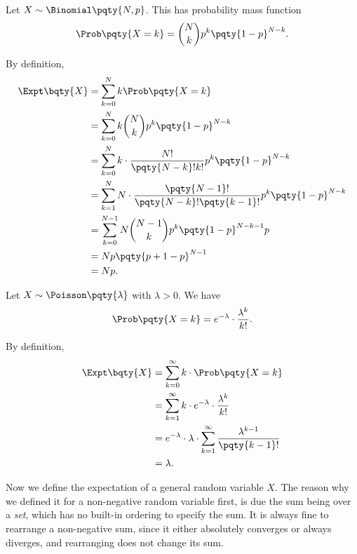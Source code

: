 \begin{example}
    \label{ex:expectation-binomial}%
    Let \(X \sim \Binomial\pqty{N, p}\). This has probability mass function
    \[
        \Prob\pqty{X = k} = \binom{N}{k} p^k \pqty{1 - p}^{N - k}.
    \]

    By definition,
    \begin{align*}
        \Expt\bqty{X} &= \sum_{k = 0}^{N} k \Prob\pqty{X = k} \\
        &= \sum_{k = 0}^{N} k \binom{N}{k} p^k \pqty{1 - p}^{N - k} \\
        &= \sum_{k = 0}^{N} k \cdot \frac{N!}{\pqty{N - k}! k!} p^k \pqty{1 - p}^{N - k} \\
        &= \sum_{k = 1}^{N} N \cdot \frac{\pqty{N - 1}!}{\pqty{N - k}! \pqty{k - 1}!} p^k \pqty{1 - p}^{N - k} \\
        &= \sum_{k = 0}^{N - 1} N \binom{N - 1}{k} p^{k} \pqty{1 - p}^{N - k - 1} p \\
        &= Np \pqty{p + 1 - p}^{N - 1} \\
        &= Np.
    \end{align*}
\end{example}

\begin{example}
    \label{ex:expectation-poisson}%
    Let \(X \sim \Poisson\pqty{\lambda}\) with \(\lambda > 0\). We have
    \[
        \Prob\pqty{X = k} = e^{-\lambda} \cdot \frac{\lambda^k}{k!}.
    \]

    By definition,
    \begin{align*}
        \Expt\bqty{X} &= \sum_{k = 0}^{\infty} k \cdot \Prob\pqty{X = k} \\
        &= \sum_{k = 1}^{\infty} k \cdot e^{-\lambda} \cdot \frac{\lambda^k}{k!} \\
        &= e^{-\lambda} \cdot \lambda \cdot \sum_{k = 1}^{\infty} \frac{\lambda^{k - 1}}{\pqty{k - 1}!} \\
        &=\lambda.
    \end{align*}
\end{example}

Now we define the expectation of a general random variable \(X\). The reason why we defined it for a non-negative random variable first, is due the sum being over a \emph{set}, which has no built-in ordering to specify the sum. It is always fine to rearrange a non-negative sum, since it either absolutely converges or always diverges, and rearranging does not change its sum.

